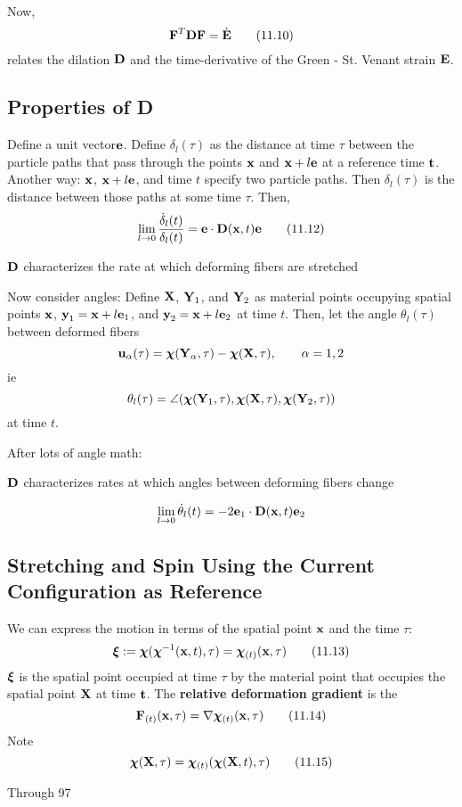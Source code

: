 \documentclass{article}
\newcommand{\Chi}{\boldsymbol{\chi}}
\begin{document}
Now,
\[
	\textbf{F}^T\textbf{D}\textbf{F} = \dot{\textbf{E}}\tag{11.10}
\]
relates the dilation $\textbf{D}$ and the time-derivative of the Green - St. Venant strain $\textbf{E}$.

\subsection{Properties of D}
Define a unit vector$\textbf{e}$. Define $\delta_l(\tau)$ as the distance at time $\tau$ between the particle paths that pass through the points $\textbf{x}$ and $\textbf{x} + l\textbf{e}$ at a reference time $\textbf{t}$. Another way: $\textbf{x}$, $\textbf{x} +l\textbf{e}$, and time $t$ specify two particle paths. Then $\delta_l(\tau)$ is the distance between those paths at some time $\tau$.
Then,
\[
	\lim\limits_{l\to 0}\frac{\dot{\delta}_l(t)}{\delta_l(t)} = \textbf{e}\cdot\textbf{D}(\textbf{x},t)\textbf{e}\tag{11.12}
\]
\begin{remark}
	$\textbf{D}$ characterizes the rate at which deforming fibers are stretched
\end{remark}

Now consider angles:
Define $\textbf{X}$, $\textbf{Y}_1$, and $\textbf{Y}_2$ as material points occupying spatial points $\textbf{x}$, $\textbf{y}_1= \textbf{x} + l\textbf{e}_1$, and $\textbf{y}_2 = \textbf{x} + l\textbf{e}_2$ at time $t$. Then, let the angle $\theta_l(\tau)$ between deformed fibers
\[
	\u_\alpha(\tau) = \Chi (\Y_\alpha, \tau ) - \Chi (\X, \tau ), \qquad \alpha = 1,2
\]
ie
\[
	\theta_l(\tau) = \angle(\Chi(\Y_1, \tau), \Chi(\X, \tau), \Chi(\Y_2, \tau))
\]
at time $t$.

After lots of angle math:
\begin{remark}
	$\textbf{D}$ characterizes rates at which angles between deforming fibers change
\end{remark}

\[
	\lim\limits_{l\to 0}\dot{\theta}_l(t) = -2\textbf{e}_1\cdot\textbf{D}(\textbf{x},t)\textbf{e}_2
\]

\subsection{Stretching and Spin Using the Current Configuration as Reference}
We can express the motion in terms of the spatial point $\textbf{x}$ and the time $\tau$:
\[
	\boldsymbol{\xi} \eqdef \Chi(\Chi\inv(\x,t),\tau) = \Chi_{(t)}(\x,\tau)\tag{11.13}
\]
$\boldsymbol{\xi}$ is the spatial point occupied at time $\tau$ by the material point that occupies the spatial point $\textbf{X}$ at time $\textbf{t}$.
The \textbf{relative deformation gradient} is the
\[
	\F_{(t)}(\x,\tau) = \del\Chi_{(t)}(\x,\tau)\tag{11.14}
\]
Note
\[
	\Chi(\X,\tau) = \Chi_{(t)}(\Chi(\X,t),\tau)\tag{11.15}
\]






Through 97
\end{document}
